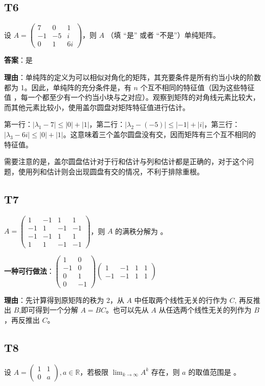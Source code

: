 \documentclass{article}
\begin{document}
\subsection{T6}

\par 设 $A=\begin{pmatrix}
	7 & 0 & 1\\
	-1 & -5 & i\\
	0 & 1 & 6i
\end{pmatrix}$，则 $A$ \underline{\phantom{empty\_space}}（填 “是” 或者 “不是”）单纯矩阵。

\par \textbf{答案}：是

\par \textbf{理由}：单纯阵的定义为可以相似对角化的矩阵，其充要条件是所有约当小块的阶数都为 1。因此，单纯阵的充分条件是，有 $n$ 个互不相同的特征值（因为这些特征值 ，每一个都至少有一个约当小块与之对应）。观察到矩阵的对角线元素比较大，而其他元素比较小，使用盖尔圆盘对矩阵特征值进行估计。

第一行：$|\lambda_1-7|\leq |0| + |1|$，第二行：$|\lambda_2-(-5)|\leq |-1| + |i|$，第三行：$|\lambda_3-6i|\leq |0| + |1|$。这意味着三个盖尔圆盘没有交，因而矩阵有三个互不相同的特征值。

需要注意的是，盖尔圆盘估计对于行和估计与列和估计都是正确的，对于这个问题，使用列和估计则会出现圆盘有交的情况，不利于排除重根。

\subsection{T7}

\par $A=\begin{pmatrix}
	1 & -1 & 1 & 1\\
	-1 & 1 & -1 & -1\\
	-1 & -1 & 1 & 1\\
	1 & 1 & -1 & -1
\end{pmatrix}$，则 $A$ 的满秩分解为 \underline{\phantom{empty\_space}}。

\par \textbf{一种可行做法}：$\begin{pmatrix}
	1 & 0\\
	-1 & 0\\
	0 & 1\\
	0 & -1
\end{pmatrix} \begin{pmatrix}
	1 & -1 & 1 & 1\\
	-1 & -1 & 1 & 1
\end{pmatrix}$

\par \textbf{理由}：先计算得到原矩阵的秩为 2，从 $A$ 中任取两个线性无关的行作为 $C$, 再反推出 $B$,即可得到一个分解 $A=BC$。也可以先从 $A$ 从任选两个线性无关的列作为 $B$，再反推出 $C$。

\subsection{T8}

\par 设 $A=\begin{pmatrix}
	1 & 1\\
	0 & a
\end{pmatrix}, a\in \mathbb R$，若极限 $\lim_{k\to \infty}A^k$ 存在，则 $a$ 的取值范围是 \underline{\phantom{empty\_space}}。
\end{document}
